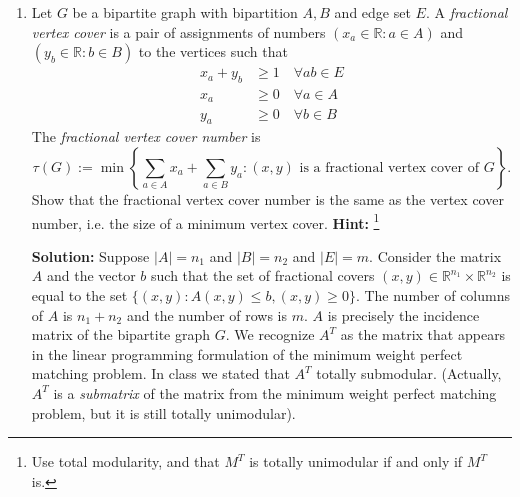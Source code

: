 \documentclass[12pt]{article}
\begin{document}
\begin{enumerate}
\item Let $G$ be a bipartite graph with bipartition $A, B$ and edge set $E$. A \emph{fractional vertex cover} is a pair of assignments of numbers $(x_a \in \mathbb{R}: a \in A)$ and $(y_b \in \mathbb{R}: b \in B)$ to the vertices such that 
\begin{align*}
x_a + y_b & \geq 1 \quad\forall ab \in E\\
x_a& \geq 0 \quad \forall a \in A\\
y_a & \geq 0 \quad \forall b \in B
\end{align*}
The \emph{fractional vertex cover number} is 
$$\tau(G) := \min\left\{\sum_{a \in A} x_a + \sum_{a \in B} y_a: (x,y) \text{ is a fractional vertex cover of } G\right\}.$$
Show that the fractional vertex cover number is the same as the vertex cover number, i.e. the size of a minimum vertex cover. \textbf{ Hint: }\footnote{Use total modularity, and that $M^T$ is totally unimodular if and only if $M^T$ is.}

\textbf{Solution: } Suppose $|A| = n_1$ and $|B| = n_2$ and $|E| = m$. Consider the matrix $A$ and the vector $b$ such that the set of fractional covers $(x,y) \in \mathbb{R}^{n_1} \times \mathbb{R}^{n_2}$ is equal to the set $\{(x,y): A (x,y) \leq b, (x,y) \geq 0\}$. The number of columns of $A$ is $n_1 + n_2$ and the number of rows is $m$. $A$ is precisely the incidence matrix of the bipartite graph $G$. We recognize $A^T$ as the matrix that appears in the linear programming formulation of the minimum weight perfect matching problem. In class we stated that $A^T$ totally submodular. (Actually, $A^T$ is a \emph{submatrix} of the matrix from the minimum weight perfect matching problem, but it is still totally unimodular). 
\end{enumerate}
\end{document}
